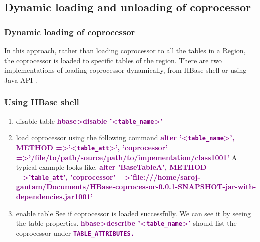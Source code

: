\documentclass[11pt,a4paper,bibtotoc,idxtotoc,headsepline,footsepline,footexclude,BCOR12mm,DIV13]{scrbook}
\begin{document}
\subsection{Dynamic loading and unloading of coprocessor}

\subsubsection{Dynamic loading of coprocessor}
In this approach, rather than loading coprocessor to all the tables in a Region, the coprocessor is loaded to specific tables of the region. There are two implementations of loading coprocessor dynamically, from HBase shell or using Java API \cite{hbase:site}.

\subsubsection{Using HBase shell}
\begin{enumerate}
	\item disable table \newline
			\space \space \textbf{\textcolor{purple}{ hbase\textgreater disable '\textless \texttt{table\_name}\textgreater'}}
	\item load coprocessor using the following command \newline
	\textbf{\textcolor{purple}{alter '\textless \texttt{table\_name}\textgreater', \newline 
	METHOD =\textgreater '\textless \texttt{table\_att}\textgreater', 'coprocessor' =\textgreater '/file/to/path\text{\textbar}\newline/source/path/to/impementation/class\text{\textbar}1001\text{\textbar}'}}
	\newline \newline
	A typical example looks like,\newline \newline
	\textbf{\textcolor{purple}{alter 'BaseTableA', METHOD =\textgreater '\texttt{table\_att}', 'coprocessor' =\textgreater 'file:///home/saroj-gautam/Documents/HBase-coprocessor-0.0.1-SNAPSHOT-jar-with-dependencies.jar\text{\textbar}\texttt {}\text{\textbar}1001\text{\textbar}'}}
	
	\item enable table \newline
	See if coprocessor is loaded successfully. We can see it by seeing the table properties. \newline 
	\textbf{\textcolor{purple}{hbase\textgreater describe '\textless \texttt{table\_name}\textgreater'}} \space should list the coprocessor under \textbf{\textcolor{purple}{\texttt{TABLE\_ATTRIBUTES.}}} \newline

\end{enumerate}
\end{document}
